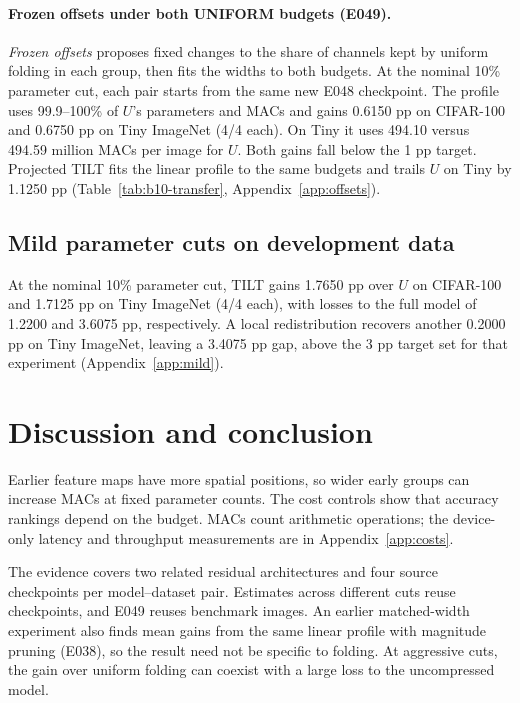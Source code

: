 \documentclass[11pt,a4paper]{article}
\newcommand{\Uniform}{UNIFORM}
\newcommand{\Tilt}{TILT}
\newcommand{\FrozenShort}{Frozen offsets}
\begin{document}
\paragraph{Frozen offsets under both \Uniform{} budgets (E049).}
\emph{\FrozenShort{}} proposes fixed changes to the share of channels
kept by uniform folding in each group, then fits the widths to both
budgets. At the nominal 10\% parameter cut, each pair starts from the
same new E048 checkpoint. The profile uses 99.9--100\% of $U$'s parameters
and MACs and gains 0.6150 pp on CIFAR-100 and 0.6750 pp on Tiny ImageNet
(4/4 each). On Tiny it uses 494.10 versus 494.59 million MACs per image
for $U$. Both gains fall below the 1 pp target. Projected TILT fits the
linear profile to the same budgets and trails $U$ on Tiny by 1.1250 pp
(Table~\ref{tab:b10-transfer}, Appendix~\ref{app:offsets}).

\subsection{Mild parameter cuts on development data}
\label{sec:matched-mild}

At the nominal 10\% parameter cut, \Tilt{} gains 1.7650 pp over $U$ on
CIFAR-100 and 1.7125 pp on Tiny ImageNet (4/4 each), with losses to the
full model of 1.2200 and 3.6075 pp, respectively. A local redistribution
recovers another 0.2000 pp on Tiny ImageNet, leaving a 3.4075 pp gap,
above the 3 pp target set for that experiment (Appendix~\ref{app:mild}).

\section{Discussion and conclusion}

Earlier feature maps have more spatial positions, so wider early groups
can increase MACs at fixed parameter counts. The cost controls show
that accuracy rankings depend on the budget. MACs count arithmetic
operations; the device-only latency and throughput measurements are in
Appendix~\ref{app:costs}.

The evidence covers two related residual architectures and four source
checkpoints per model--dataset pair. Estimates across different cuts
reuse checkpoints, and E049 reuses benchmark images. An earlier
matched-width experiment also finds mean gains from the same linear
profile with magnitude pruning (E038), so the result need not be
specific to folding. At aggressive cuts, the gain over uniform folding
can coexist with a large loss to the uncompressed model.
\end{document}
